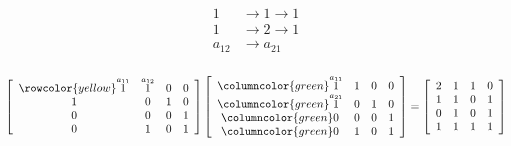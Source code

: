 \documentclass[../../Main.tex]{subfiles}
\begin{document}
\begin{align*}
    1 &\rightarrow 1 \rightarrow 1 \\
    1 &\rightarrow 2 \rightarrow 1 \\
    a_{12} &\rightarrow a_{21} \\
\end{align*}

\[
\left[
    \begin{array}{cccc}
        \rowcolor{yellow} \overset{\text{$a_{11}$}}{1} & \overset{\text{$a_{12}$}}{1} & 0 & 0 \\
        1 & 0 & 1 & 0 \\
        0 & 0 & 0 & 1 \\
        0 & 1 & 0 & 1 \\
    \end{array}
\right]
\left[
    \begin{array}{>{\columncolor{green}}c ccc}
        \overset{\text{$a_{11}$}}{1} & 1 & 0 & 0 \\
        \overset{\text{$a_{21}$}}{1} & 0 & 1 & 0 \\
        0 & 0 & 0 & 1 \\
        0 & 1 & 0 & 1 \\
    \end{array}
\right]
=
\left[
    \begin{array}{cccc}
        2 & 1 & 1 & 0 \\
        1 & 1 & 0 & 1 \\
        0 & 1 & 0 & 1 \\
        1 & 1 & 1 & 1 \\
    \end{array}
\right]
\]
\end{document}
